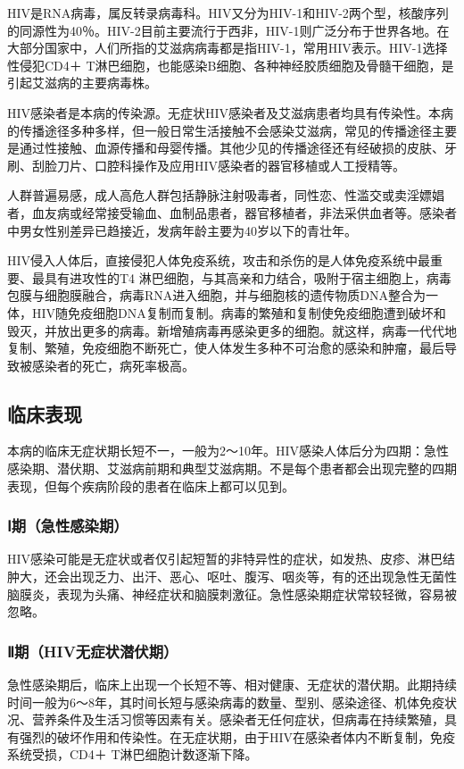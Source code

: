 HIV是RNA病毒，属反转录病毒科。HIV又分为HIV-1和HIV-2两个型，核酸序列的同源性为40％。HIV-2目前主要流行于西非，HIV-1则广泛分布于世界各地。在大部分国家中，人们所指的艾滋病病毒都是指HIV-1，常用HIV表示。HIV-1选择性侵犯CD4{＋}
T淋巴细胞，也能感染B细胞、各种神经胶质细胞及骨髓干细胞，是引起艾滋病的主要病毒株。

HIV感染者是本病的传染源。无症状HIV感染者及艾滋病患者均具有传染性。本病的传播途径多种多样，但一般日常生活接触不会感染艾滋病，常见的传播途径主要是通过性接触、血源传播和母婴传播。其他少见的传播途径还有经破损的皮肤、牙刷、刮脸刀片、口腔科操作及应用HIV感染者的器官移植或人工授精等。

人群普遍易感，成人高危人群包括静脉注射吸毒者，同性恋、性滥交或卖淫嫖娼者，血友病或经常接受输血、血制品患者，器官移植者，非法采供血者等。感染者中男女性别差异已趋接近，发病年龄主要为40岁以下的青壮年。

HIV侵入人体后，直接侵犯人体免疫系统，攻击和杀伤的是人体免疫系统中最重要、最具有进攻性的T{4}
淋巴细胞，与其高亲和力结合，吸附于宿主细胞上，病毒包膜与细胞膜融合，病毒RNA进入细胞，并与细胞核的遗传物质DNA整合为一体，HIV随免疫细胞DNA复制而复制。病毒的繁殖和复制使免疫细胞遭到破坏和毁灭，并放出更多的病毒。新增殖病毒再感染更多的细胞。就这样，病毒一代代地复制、繁殖，免疫细胞不断死亡，使人体发生多种不可治愈的感染和肿瘤，最后导致被感染者的死亡，病死率极高。

\subsection{临床表现}

本病的临床无症状期长短不一，一般为2～10年。HIV感染人体后分为四期：急性感染期、潜伏期、艾滋病前期和典型艾滋病期。不是每个患者都会出现完整的四期表现，但每个疾病阶段的患者在临床上都可以见到。

\subsubsection{Ⅰ期（急性感染期）}

HIV感染可能是无症状或者仅引起短暂的非特异性的症状，如发热、皮疹、淋巴结肿大，还会出现乏力、出汗、恶心、呕吐、腹泻、咽炎等，有的还出现急性无菌性脑膜炎，表现为头痛、神经症状和脑膜刺激征。急性感染期症状常较轻微，容易被忽略。

\subsubsection{Ⅱ期（HIV无症状潜伏期）}

急性感染期后，临床上出现一个长短不等、相对健康、无症状的潜伏期。此期持续时间一般为6～8年，其时间长短与感染病毒的数量、型别、感染途径、机体免疫状况、营养条件及生活习惯等因素有关。感染者无任何症状，但病毒在持续繁殖，具有强烈的破坏作用和传染性。在无症状期，由于HIV在感染者体内不断复制，免疫系统受损，CD4{＋}
T淋巴细胞计数逐渐下降。

